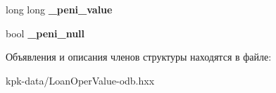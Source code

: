 \begin{DoxyCompactItemize}
\item 
long long {\bfseries \+\_\+peni\+\_\+value}\hypertarget{structodb_1_1access_1_1composite__value__traits_3_01_1_1kpk_1_1data_1_1_loan_oper_value_00_01id__pgsql_01_4_1_1image__type_a75a08776ae61023f4cb20f24bb71cead}{}\label{structodb_1_1access_1_1composite__value__traits_3_01_1_1kpk_1_1data_1_1_loan_oper_value_00_01id__pgsql_01_4_1_1image__type_a75a08776ae61023f4cb20f24bb71cead}

\item 
bool {\bfseries \+\_\+peni\+\_\+null}\hypertarget{structodb_1_1access_1_1composite__value__traits_3_01_1_1kpk_1_1data_1_1_loan_oper_value_00_01id__pgsql_01_4_1_1image__type_ad03c37849d174f433d087fd13a13725b}{}\label{structodb_1_1access_1_1composite__value__traits_3_01_1_1kpk_1_1data_1_1_loan_oper_value_00_01id__pgsql_01_4_1_1image__type_ad03c37849d174f433d087fd13a13725b}

\end{DoxyCompactItemize}


Объявления и описания членов структуры находятся в файле\+:\begin{DoxyCompactItemize}
\item 
kpk-\/data/Loan\+Oper\+Value-\/odb.\+hxx\end{DoxyCompactItemize}
